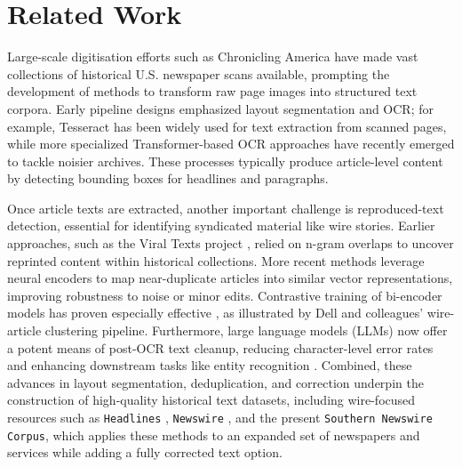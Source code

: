 \section{Related Work}
\label{sec:related}

Large-scale digitisation efforts such as Chronicling America \cite{chroniclingamer} have made vast collections of historical U.S. newspaper scans available, prompting the development of methods to transform raw page images into structured text corpora. Early pipeline designs emphasized layout segmentation and OCR; for example, Tesseract has been widely used for text extraction from scanned pages, while more specialized Transformer-based OCR approaches \cite{dell2024americanstories} have recently emerged to tackle noisier archives. These processes typically produce article-level content by detecting bounding boxes for headlines and paragraphs.

Once article texts are extracted, another important challenge is reproduced-text detection, essential for identifying syndicated material like wire stories. Earlier approaches, such as the Viral Texts project \cite{smith2015}, relied on n-gram overlaps to uncover reprinted content within historical collections. More recent methods leverage neural encoders to map near-duplicate articles into similar vector representations, improving robustness to noise or minor edits. Contrastive training of bi-encoder models has proven especially effective \cite{sentencebert}, as illustrated by Dell and colleagues’ wire-article clustering pipeline. Furthermore, large language models (LLMs) now offer a potent means of post-OCR text cleanup, reducing character-level error rates and enhancing downstream tasks like entity recognition \cite{brown2020language}. Combined, these advances in layout segmentation, deduplication, and correction underpin the construction of high-quality historical text datasets, including wire-focused resources such as \texttt{Headlines} \cite{headlines2024}, \texttt{Newswire} \cite{dell2024newswire}, and the present \texttt{Southern Newswire Corpus}, which applies these methods to an expanded set of newspapers and services while adding a fully corrected text option.